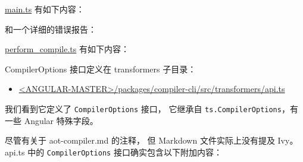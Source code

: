 
\href{https://github.com/angular/angular/blob/master/packages/compiler-cli/src/main.ts}{main.ts}
有如下内容：




和一个详细的错误报告：




\href{https://github.com/angular/angular/blob/master/packages/compiler-cli/src/perform_compile.ts}
{perform\_compile.ts}
有如下内容：




CompilerOptions 接口定义在 transformers 子目录：

\begin{itemize}
  \item \href{https://github.com/angular/angular/blob/master/packages/compiler-cli/src/transformers/api.ts}
        {<ANGULAR-MASTER>/packages/compiler-cli/src/transformers/api.ts}
\end{itemize}


我们看到它定义了 \texttt{CompilerOptions} 接口，
它继承自 \texttt{ts.CompilerOptions}，有一些 Angular 特殊字段。




尽管有关于 aot-compiler.md 的注释，
但 Markdown 文件实际上没有提及 Ivy。
api.ts 中的 \texttt{CompilerOptions} 接口确实包含以下附加内容：




